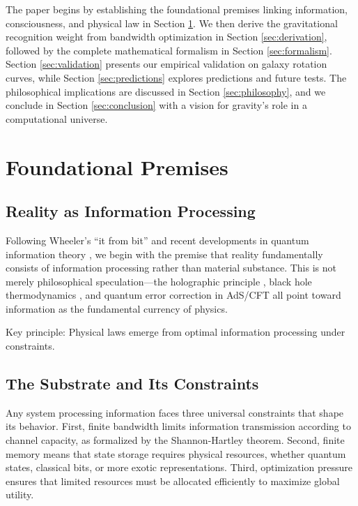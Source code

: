 \documentclass[twocolumn,prd,amsmath,amssymb,aps,superscriptaddress,nofootinbib]{revtex4-2}
\begin{document}
The paper begins by establishing the foundational premises linking information, consciousness, and physical law in Section \ref{sec:foundations}. We then derive the gravitational recognition weight from bandwidth optimization in Section \ref{sec:derivation}, followed by the complete mathematical formalism in Section \ref{sec:formalism}. Section \ref{sec:validation} presents our empirical validation on galaxy rotation curves, while Section \ref{sec:predictions} explores predictions and future tests. The philosophical implications are discussed in Section \ref{sec:philosophy}, and we conclude in Section \ref{sec:conclusion} with a vision for gravity's role in a computational universe.

\section{Foundational Premises}
\label{sec:foundations}

\subsection{Reality as Information Processing}

Following Wheeler's ``it from bit'' \cite{Wheeler1990} and recent developments in quantum information theory \cite{Lloyd2002}, we begin with the premise that reality fundamentally consists of information processing rather than material substance. This is not merely philosophical speculation---the holographic principle \cite{tHooft1993,Susskind1995}, black hole thermodynamics \cite{Bekenstein1973}, and quantum error correction in AdS/CFT \cite{Almheiri2015} all point toward information as the fundamental currency of physics.

Key principle: Physical laws emerge from optimal information processing under constraints.

\subsection{The Substrate and Its Constraints}

Any system processing information faces three universal constraints that shape its behavior. First, finite bandwidth limits information transmission according to channel capacity, as formalized by the Shannon-Hartley theorem. Second, finite memory means that state storage requires physical resources, whether quantum states, classical bits, or more exotic representations. Third, optimization pressure ensures that limited resources must be allocated efficiently to maximize global utility.
\end{document}
